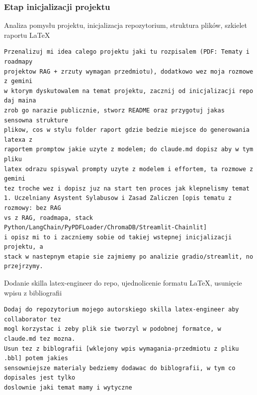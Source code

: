 \subsubsection*{Etap inicjalizacji projektu}

  {Analiza pomysłu projektu, inicjalizacja repozytorium, struktura plików, szkielet raportu LaTeX}
\begin{lstlisting}
Przenalizuj mi idea calego projektu jaki tu rozpisalem (PDF: Tematy i roadmapy
projektow RAG + zrzuty wymagan przedmiotu), dodatkowo wez moja rozmowe z gemini
w ktorym dyskutowalem na temat projektu, zacznij od inicjalizacji repo daj maina
zrob go narazie publicznie, stworz README oraz przygotuj jakas sensowna strukture
plikow, cos w stylu folder raport gdzie bedzie miejsce do generowania latexa z
raportem promptow jakie uzyte z modelem; do claude.md dopisz aby w tym pliku
latex odrazu spisywal prompty uzyte z modelem i effortem, ta rozmowe z gemini
tez troche wez i dopisz juz na start ten proces jak klepnelismy temat
1. Uczelniany Asystent Sylabusow i Zasad Zaliczen [opis tematu z rozmowy: bez RAG
vs z RAG, roadmapa, stack Python/LangChain/PyPDFLoader/ChromaDB/Streamlit-Chainlit]
i opisz mi to i zaczniemy sobie od takiej wstepnej inicjalizacji projektu, a
stack w nastepnym etapie sie zajmiemy po analizie gradio/streamlit, no
przejrzymy.
\end{lstlisting}

  {Dodanie skilla latex-engineer do repo, ujednolicenie formatu LaTeX, usunięcie wpisu z bibliografii}
\begin{lstlisting}
Dodaj do repozytorium mojego autorskiego skilla latex-engineer aby collaborator tez
mogl korzystac i zeby plik sie tworzyl w podobnej formatce, w claude.md tez mozna.
Usun tez z biblografii [wklejony wpis wymagania-przedmiotu z pliku .bbl] potem jakies
sensowniejsze materialy bedziemy dodawac do biblografii, w tym co dopisales jest tylko
doslownie jaki temat mamy i wytyczne
\end{lstlisting}

